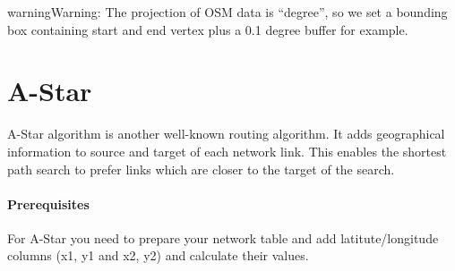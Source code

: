 \documentclass[a4paper,10pt,english]{manual}
\begin{document}
\begin{notice}{warning}{Warning:}
The projection of OSM data is ``degree'', so we set a bounding box containing start and end vertex plus a 0.1 degree buffer for example.
\end{notice}


\section{A-Star}

A-Star algorithm is another well-known routing algorithm. It adds geographical information to source and target of each network link. This enables the shortest path search to prefer links which are closer to the target of the search.
\paragraph{Prerequisites}

For A-Star you need to prepare your network table and add latitute/longitude columns (x1, y1 and x2, y2) and calculate their values.
\end{document}
